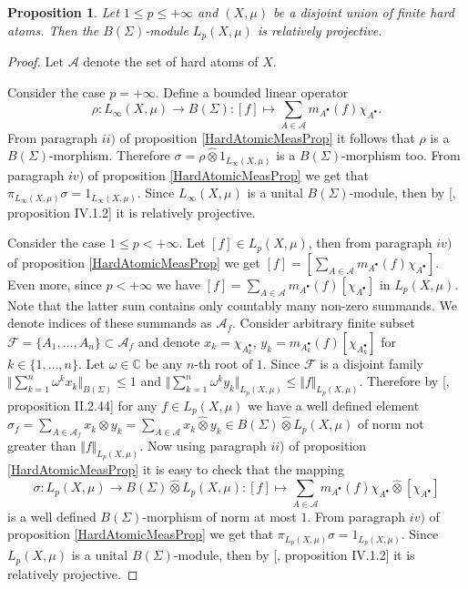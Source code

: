 \documentclass[12pt]{article}
\newtheorem{proposition}[theorem]{Proposition}
\newcommand{\projtens}{\mathbin{\widehat{\otimes}}}
\begin{document}
\begin{proposition}\label{LpBSigmaModSuffCond} Let $1\leq p\leq +\infty$ and $(X,\mu)$ be a disjoint union of finite hard atoms. Then the $B(\Sigma)$-module $L_p(X,\mu)$ is relatively projective.
\end{proposition}
\begin{proof} Let $\mathcal{A}$ denote the set of hard atoms of $X$.

    Consider the case $p=+\infty$. Define a bounded linear operator
    $$
        \rho:L_\infty(X,\mu)\to B(\Sigma):[f]\mapsto\sum_{A\in\mathcal{A}}m_{A^\bullet}(f)\chi_{A^\bullet}.
    $$
    From paragraph $ii)$ of proposition \ref{HardAtomicMeasProp} it follows that $\rho$ is a $B(\Sigma)$-morphism. Therefore $\sigma=\rho\projtens 1_{L_\infty(X,\mu)}$ is a $B(\Sigma)$-morphism too. From paragraph $iv)$ of proposition \ref{HardAtomicMeasProp} we get that $\pi_{L_\infty(X,\mu)}\sigma=1_{L_\infty(X,\mu)}$. Since $L_\infty(X,\mu)$ is a unital $B(\Sigma)$-module, then by [\cite{HelHomolBanTopAlg}, proposition IV.1.2] it is relatively projective.

    Consider the case $1\leq p<+\infty$. Let $[f]\in L_p(X,\mu)$, then from paragraph $iv)$ of proposition \ref{HardAtomicMeasProp} we get $[f]=[\sum_{A\in\mathcal{A}}m_{A^\bullet}(f)\chi_{A^\bullet}]$. Even more, since $p<+\infty$ we have $[f]=\sum_{A\in\mathcal{A}}m_{A^\bullet}(f)[\chi_{A^\bullet}]$ in $L_p(X,\mu)$. Note that the latter sum contains only countably many non-zero summands. We denote indices of these summands as $\mathcal{A}_f$. Consider arbitrary finite subset $\mathcal{F}=\{A_1,\ldots,A_n\}\subset\mathcal{A}_f$ and denote $x_k=\chi_{A_k^\bullet}$, $y_k=m_{A_k^\bullet}(f)[\chi_{A_k^\bullet}]$ for $k\in\{1,\ldots,n\}$. Let $\omega\in\mathbb{C}$ be any $n$-th root of $1$. Since $\mathcal{F}$ is a disjoint family
    $\Vert\sum_{k=1}^n \omega^k x_k\Vert_{B(\Sigma)}\leq 1$ and $\Vert \sum_{k=1}^n\omega^k y_k\Vert_{L_p(X,\mu)}\leq\Vert f\Vert_{L_p(X,\mu)}$. Therefore by [\cite{HelHomolBanTopAlg}, proposition II.2.44] for any $f\in L_p(X,\mu)$ we have a well defined element $\sigma_f=\sum_{A\in\mathcal{A}_f} x_k\projtens y_k=\sum_{A\in\mathcal{A}} x_k\projtens y_k\in B(\Sigma)\projtens L_p(X,\mu)$ of norm not greater than $\Vert f\Vert_{L_p(X,\mu)}$. Now using paragraph $ii)$ of proposition \ref{HardAtomicMeasProp} it is easy to check that the mapping
    $$
        \sigma: L_p(X,\mu)\to B(\Sigma)\projtens L_p(X,\mu):[f]\mapsto \sum_{A\in\mathcal{A}}m_{A^\bullet}(f)\chi_{A^\bullet}\projtens[\chi_{A^\bullet}]
    $$
    is a well defined $B(\Sigma)$-morphism of norm at most $1$. From paragraph $iv)$ of proposition \ref{HardAtomicMeasProp} we get that $\pi_{L_p(X,\mu)}\sigma=1_{L_p(X,\mu)}$. Since $L_p(X,\mu)$ is a unital $B(\Sigma)$-module, then by [\cite{HelHomolBanTopAlg}, proposition IV.1.2] it is relatively projective.
\end{proof}
\end{document}
